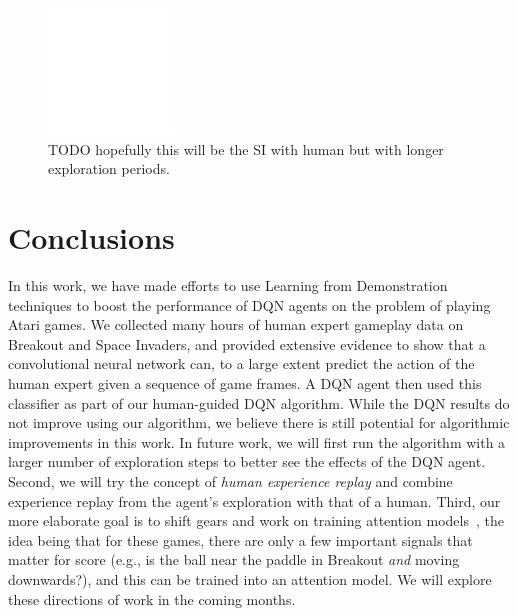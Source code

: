 \documentclass[letterpaper, 10pt, conference]{ieeeconf}
\begin{document}
\begin{figure}[t]
\centering
\includegraphics[width=0.30\textwidth]{figures/empty.png}
\caption{\footnotesize
TODO hopefully this will be the SI with human but with longer exploration
periods.
}
\label{fig:...}
\end{figure}

\section{Conclusions}\label{sec:conclusions}

In this work, we have made efforts to use Learning from Demonstration techniques
to boost the performance of DQN agents on the problem of playing Atari games. We
collected many hours of human expert gameplay data on Breakout and Space
Invaders, and provided extensive evidence to show that a convolutional
neural network can, to a large extent predict the action of the human expert
given a sequence of game frames. A DQN agent then used this classifier as part
of our human-guided DQN algorithm. While the DQN results do not improve using
our algorithm, we believe there is still potential for algorithmic improvements
in this work. In future work, we will first run the algorithm with a larger
number of exploration steps to better see the effects of the DQN agent. Second,
we will try the concept of \emph{human experience replay} and combine experience
replay from the agent's exploration with that of a human. Third, our more
elaborate goal is to shift gears and work on training attention
models~\cite{NIPS2014_5542,icml2015_xuc15}, the idea being that for these games,
there are only a few important signals that matter for score (e.g., is the ball
near the paddle in Breakout \emph{and} moving downwards?), and this can be
trained into an attention model. We will explore these directions of work in the
coming months.





\end{document}
